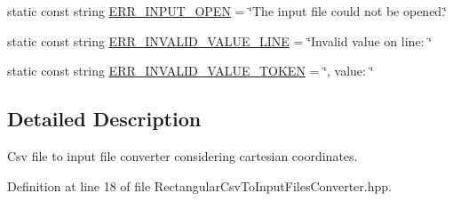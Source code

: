 \begin{DoxyCompactItemize}
\item 
static const string \hyperlink{classmultiscale_1_1video_1_1RectangularCsvToInputFilesConverter_a5d23713c8025b1a50cfce86ae9e1a414}{E\-R\-R\-\_\-\-I\-N\-P\-U\-T\-\_\-\-O\-P\-E\-N} = \char`\"{}The input file could not be opened.\char`\"{}
\item 
static const string \hyperlink{classmultiscale_1_1video_1_1RectangularCsvToInputFilesConverter_a74375bb73bfbad130b8cf9020ae5b0e6}{E\-R\-R\-\_\-\-I\-N\-V\-A\-L\-I\-D\-\_\-\-V\-A\-L\-U\-E\-\_\-\-L\-I\-N\-E} = \char`\"{}Invalid value on line\-: \char`\"{}
\item 
static const string \hyperlink{classmultiscale_1_1video_1_1RectangularCsvToInputFilesConverter_af32101eebb5b7f8d6773e30516728415}{E\-R\-R\-\_\-\-I\-N\-V\-A\-L\-I\-D\-\_\-\-V\-A\-L\-U\-E\-\_\-\-T\-O\-K\-E\-N} = \char`\"{}, value\-: \char`\"{}
\end{DoxyCompactItemize}


\subsection{Detailed Description}
Csv file to input file converter considering cartesian coordinates. 

Definition at line 18 of file Rectangular\-Csv\-To\-Input\-Files\-Converter.\-hpp.



